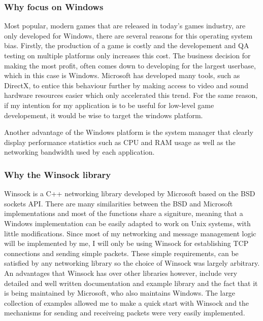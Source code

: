 \subsubsection{Why focus on Windows}
Most popular, modern games that are released in today's games industry, are only developed for Windows, there are several reasons for this operating system bias. Firstly, the production of a game is costly and the developement and QA testing on multiple platforms only increases this cost. The business decision for making the most profit, often comes down to developing for the largest userbase, which in this case is Windows. Microsoft has developed many tools, such as DirectX, to entice this behaviour further by making access to video and sound hardware resources easier which only accelerated this trend.
For the same reason, if my intention for my application is to be useful for low-level game developement, it would be wise to target the windows platform.

Another advantage of the Windows platform is the system manager that clearly display performance statistics such as CPU and RAM usage as well as the networking bandwidth used by each application.


\subsubsection{Why the Winsock library}
Winsock is a C++ networking library developed by Microsoft based on the BSD sockets API. There are many similarities between the BSD and Microsoft implementations and most of the functions share a signiture, meaning that a Windows implementation can be easily adapted to work on Unix systems, with little modifications. Since most of my networking and message management logic will be implemented by me, I will only be using Winsock for establishing TCP connections and sending simple packets. These simple requirements, can be satisfied by any networking library so the choice of Winsock was largely arbitrary. An advantages that Winsock has over other libraries however, include very detailed and well written documentation and example library and the fact that it is being maintained by Microsoft, who also maintains Windows. The large collection of examples allowed me to make a quick start with Winsock and the mechanisms for sending and receiveing packets were very easily implemented.

